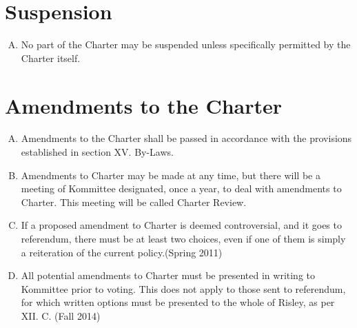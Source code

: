 \documentclass[12pt]{article}
\begin{document}
\section{Suspension}
\begin{enumerate}[A.]
\item No part of the Charter may be suspended unless specifically permitted by the Charter itself.
\end{enumerate}
\section{Amendments to the Charter}
\begin{enumerate}[A.]
\item Amendments to the Charter shall be passed in accordance with the provisions established in section XV. By-Laws.
\item Amendments to Charter may be made at any time, but there will be a meeting of Kommittee designated, once a year, to deal with amendments to Charter. This meeting will be called Charter Review.
\item If a proposed amendment to Charter is deemed controversial, and it goes to referendum, there must be at least two choices, even if one of them is simply a reiteration of the current policy.(Spring 2011)
\item All potential amendments to Charter must be presented in writing to Kommittee prior to voting.  This does not apply to those sent to referendum, for which written options must be presented to the whole of Risley, as per XII. C. (Fall 2014)
\end{enumerate}
\end{document}
